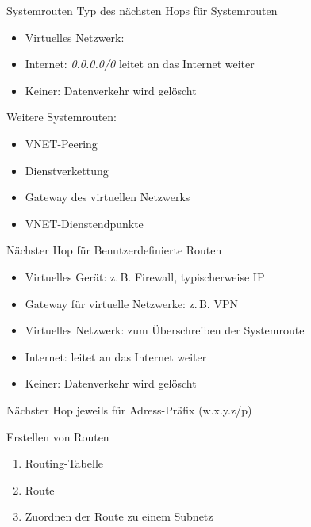 
\begin{flashcard}[Definition]{Systemrouten}
    Typ des nächsten Hops für Systemrouten
    \begin{itemize}
        \item Virtuelles Netzwerk:
        \item Internet: \emph{0.0.0.0/0} leitet an das Internet weiter
        \item Keiner: Datenverkehr wird gelöscht
    \end{itemize}

    Weitere Systemrouten:
    \begin{itemize}
        \item VNET-Peering
        \item Dienstverkettung
        \item Gateway des virtuellen Netzwerks
        \item VNET-Dienstendpunkte
    \end{itemize}

\end{flashcard}

\begin{flashcard}[Definition]{Nächster Hop für Benutzerdefinierte Routen}
    \begin{itemize}
        \item Virtuelles Gerät: z.\,B. Firewall, typischerweise IP
        \item Gateway für virtuelle Netzwerke: z.\,B. VPN
        \item Virtuelles Netzwerk: zum Überschreiben der Systemroute
        \item Internet: leitet an das Internet weiter
        \item Keiner: Datenverkehr wird gelöscht
    \end{itemize}
    \vspace{1cm}
    Nächster Hop jeweils für Adress-Präfix (w.x.y.z/p)
\end{flashcard}

\begin{flashcard}[Definition]{Erstellen von Routen}
    \begin{enumerate}
        \item Routing-Tabelle
        \item Route
        \item Zuordnen der Route zu einem Subnetz
    \end{enumerate}
\end{flashcard}

